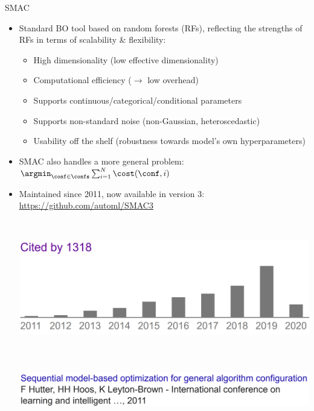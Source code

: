 \begin{frame}[c]{SMAC  }

\begin{itemize}
    \item Standard BO tool based on random forests (RFs), reflecting the strengths of RFs in terms of \alert{scalability \& flexibility}:
    \begin{itemize}
        \item High dimensionality (low effective dimensionality)
        \item Computational efficiency ($\rightarrow$ low overhead)
        \item Supports continuous/categorical/conditional parameters
        \item Supports non-standard noise (non-Gaussian, heteroscedastic)
        \item Usability off the shelf (robustness towards model's own hyperparameters)
    \end{itemize}

\pause
\smallskip
    \item SMAC also handles a more general problem:
    $\argmin_{\conf\in\confs} \sum_{i=1}^N \cost(\conf,i)$
\pause
\smallskip
    \item Maintained since 2011, now available in version 3: \url{https://github.com/automl/SMAC3}

\begin{columns}
~\\
\includegraphics[width=1\linewidth, keepaspectratio=true]{images/success_stories/SMAC_citations.png}
~\\
~\\
~\\
\includegraphics[width=1\linewidth, keepaspectratio=true]{images/success_stories/SMAC_paper.png}
~\\
\end{columns}    
\end{itemize}
\end{frame}

